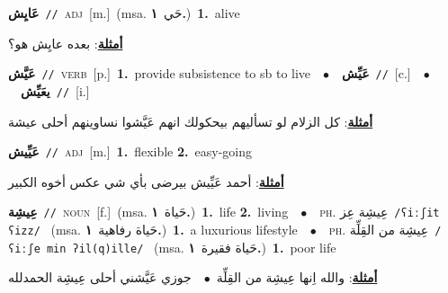 \documentclass[10pt,a4paper,twoside]{article} %
\begin{document}
\begin{multicols}{2}
{\setlength\topsep{0pt}\textbf{\foreignlanguage{arabic}{عَايِش}}\ {\color{gray}\texttt{//}\color{black}}\ \textsc{adj}\ [m.]\ \color{gray}(msa. \foreignlanguage{arabic}{حَي}~\foreignlanguage{arabic}{\textbf{١.}})\color{black}\ \textbf{1.}~alive\  \begin{flushright}\color{gray}\foreignlanguage{arabic}{\textbf{\underline{\foreignlanguage{arabic}{أمثلة}}}: بعده عايِش هو؟}\end{flushright}\color{black}} \vspace{2mm}

{\setlength\topsep{0pt}\textbf{\foreignlanguage{arabic}{عَيَّش}}\ {\color{gray}\texttt{//}\color{black}}\ \textsc{verb}\ [p.]\ \textbf{1.}~provide subsistence to sb to live\ \ $\bullet$\ \ \setlength\topsep{0pt}\textbf{\foreignlanguage{arabic}{عَيِّش}}\ {\color{gray}\texttt{//}\color{black}}\ [c.]\ \ $\bullet$\ \ \setlength\topsep{0pt}\textbf{\foreignlanguage{arabic}{يعَيِّش}}\ {\color{gray}\texttt{//}\color{black}}\ [i.]\  \begin{flushright}\color{gray}\foreignlanguage{arabic}{\textbf{\underline{\foreignlanguage{arabic}{أمثلة}}}: كل الزلام لو تسأليهم بيحكولك انهم عَيَّشوا نساوينهم أحلى عيشة}\end{flushright}\color{black}} \vspace{2mm}

{\setlength\topsep{0pt}\textbf{\foreignlanguage{arabic}{عَيِّيش}}\ {\color{gray}\texttt{//}\color{black}}\ \textsc{adj}\ [m.]\ \textbf{1.}~flexible  \textbf{2.}~easy-going\  \begin{flushright}\color{gray}\foreignlanguage{arabic}{\textbf{\underline{\foreignlanguage{arabic}{أمثلة}}}: أحمد عَيِّيش بيرضى بأي شي عكس أخوه الكبير}\end{flushright}\color{black}} \vspace{2mm}

{\setlength\topsep{0pt}\textbf{\foreignlanguage{arabic}{عِيشِة}}\ {\color{gray}\texttt{//}\color{black}}\ \textsc{noun}\ [f.]\ \color{gray}(msa. \foreignlanguage{arabic}{حَياة}~\foreignlanguage{arabic}{\textbf{١.}})\color{black}\ \textbf{1.}~life  \textbf{2.}~living\ \ $\bullet$\ \ \textsc{ph.} \color{gray} \foreignlanguage{arabic}{عِيشِة عِز}\color{black}\ {\color{gray}\texttt{/{\sffamily ʕiːʃit ʕizz}/}\color{black}}\ \color{gray} (msa. \foreignlanguage{arabic}{حَياة رفاهية}~\foreignlanguage{arabic}{\textbf{١.}})\color{black}\ \textbf{1.}~a luxurious lifestyle\ \ $\bullet$\ \ \textsc{ph.} \color{gray} \foreignlanguage{arabic}{عِيشِة من القِلِّة}\color{black}\ {\color{gray}\texttt{/{\sffamily ʕiːʃe min ʔil(q)ille}/}\color{black}}\ \color{gray} (msa. \foreignlanguage{arabic}{حَياة فقيرة}~\foreignlanguage{arabic}{\textbf{١.}})\color{black}\ \textbf{1.}~poor life\  \begin{flushright}\color{gray}\foreignlanguage{arabic}{\textbf{\underline{\foreignlanguage{arabic}{أمثلة}}}: والله اِنها عِيشِة من القِلِّة\ $\bullet$\ \  جوزي عَيَّشني أحلى عِيشِة الحمدلله}\end{flushright}\color{black}} \vspace{2mm}


\end{multicols}
\end{document}
